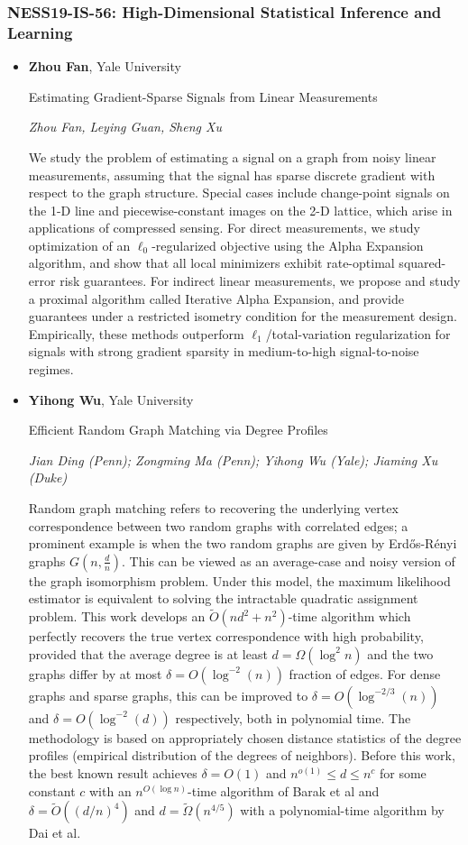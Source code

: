 \subsubsection*{NESS19-IS-56: High-Dimensional Statistical Inference and Learning}

\begin{itemize}
\item \textbf{Zhou Fan}, Yale University

Estimating Gradient-Sparse Signals from Linear Measurements

\emph{\footnotesize Zhou Fan, Leying Guan, Sheng Xu}

We study the problem of estimating a signal on a graph from noisy linear measurements, assuming that the signal has sparse discrete gradient with respect to the graph structure. Special cases include change-point signals on the 1-D line and piecewise-constant images on the 2-D lattice, which arise in applications of compressed sensing. For direct measurements, we study optimization of an $\ell_0$-regularized objective using the Alpha Expansion algorithm, and show that all local minimizers exhibit rate-optimal squared-error risk guarantees. For indirect linear measurements, we propose and study a proximal algorithm called Iterative Alpha Expansion, and provide guarantees under a restricted isometry condition for the measurement design. Empirically, these methods outperform $\ell_1$/total-variation regularization for signals with strong gradient sparsity in medium-to-high signal-to-noise regimes.

\item \textbf{Yihong Wu}, Yale University

Efficient Random Graph Matching via Degree Profiles

\emph{\footnotesize Jian Ding (Penn); Zongming Ma (Penn); Yihong Wu (Yale); Jiaming Xu (Duke)}

Random graph matching refers to recovering the underlying vertex correspondence between two random graphs with correlated edges; a prominent example is when the two random graphs are given by Erd\H{o}s-R\'{e}nyi graphs $G(n,\frac{d}{n})$. This can be viewed as an average-case and noisy version of the graph isomorphism problem. Under this model, the maximum likelihood estimator is equivalent to solving the intractable quadratic assignment problem. This work develops an $\tilde{O}(n d^2+n^2)$-time algorithm which perfectly recovers the true vertex correspondence with high probability, provided that the average degree is at least $d = \Omega(\log^2 n)$ and the two graphs differ by at most $\delta = O( \log^{-2}(n) )$ fraction of edges. For dense graphs and sparse graphs, this can be improved  to $\delta = O( \log^{-2/3}(n) )$ and $\delta = O( \log^{-2}(d) )$ respectively, both in polynomial time. The methodology is based on appropriately chosen distance statistics of the degree profiles (empirical distribution of the degrees of neighbors). Before this work, the best known result achieves $\delta=O(1)$ and $n^{o(1)} \leq d \leq n^c$ for some constant $c$ with an $n^{O(\log n)}$-time algorithm of Barak et al and $\delta=\tilde O((d/n)^4)$ and $d = \tilde{\Omega}(n^{4/5})$ with a polynomial-time algorithm by Dai et al.


\end{itemize}
